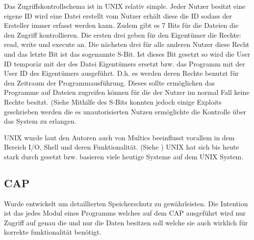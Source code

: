 \documentclass[9pt,technote]{IEEEtran}
\begin{document}
    Das Zugriffskontrollschema ist in UNIX relativ simple. Jeder Nutzer besitzt eine eigene ID wird eine Datei erstellt vom Nutzer erh\"alt diese die ID sodass der Ersteller immer
    erfasst werden kann. Zudem gibt es 7 Bits f\"ur die Dateien die den Zugriff kontrollieren. Die ersten drei geben f\"ur den Eigent\"umer die Rechte: read, write und execute an.
    Die n\"achsten drei f\"ur alle anderen Nutzer diese Recht und das letzte Bit ist das sogenannte S-Bit. Ist dieses Bit gesetzt so wird die User ID tempor\"ar
    mit der des Datei Eigent\"umers ersetzt bzw. das Programm mit der User ID des Eigent\"umers ausgef\"uhrt.
    D.h. es werden deren Rechte benutzt f\"ur den Zeitraum der Programmausf\"uhrung. Dieses sollte erm\"oglichen das Programme
    auf Dateien zugreifen k\"onnen f\"ur die der Nutzer im normal Fall keine Rechte besitzt. (Siehe \cite[S. 367]{inproc:unix}    
    Mithilfe des S-Bits konnten jedoch einige Exploits geschrieben werden die es unautorisierten Nutzen erm\"oglichte
    die Kontrolle \"uber das System zu erlangen. 
    
    UNIX wurde laut den Autoren auch von Multics beeinflusst vorallem in dem Bereich I/O, Shell und deren Funktionalit\"at. (Siehe \cite[S. 374]{inproc:unix})
    UNIX hat sich bis heute stark durch gesetzt bzw. basieren viele heutige Systeme auf dem UNIX System.
    
   \subsection{CAP}
     Wurde entwickelt um detaillierten Speicherschutz zu gew\"ahrleisten. Die Intention ist das jedes Modul eines Programms welches auf dem CAP ausgef\"uhrt wird
     nur Zugriff auf genau die und nur die Daten besitzen soll welche sie auch wirklich f\"ur korrekte funktionalit\"at ben\"otigt.
     
\end{document}
